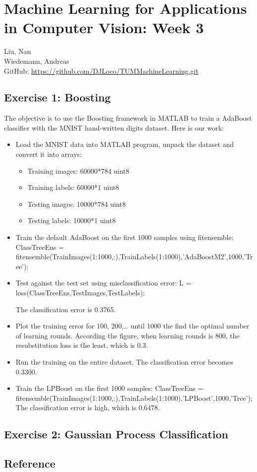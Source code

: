 \message{ !name(mlex3.tex)}\documentclass[12pt,a4paper,twoside]{article}
\begin{document}

\section*{Machine Learning for Applications \\
in Computer Vision: Week 3}
\hrulefill

Liu, Nan \\
Wiedemann, Andreas\\

GitHub: \url{https://github.com/DJLoco/TUMMachineLearning.git}\\


\hrulefill

\subsection*{Exercise 1: Boosting}
The objective is to use the Boosting framework in MATLAB to train a AdaBoost classifier with the MNIST hand-written digits dataset. Here is our work:

\begin{itemize}
\item Load the MNIST data into MATLAB program, unpack the dataset and convert it into arrays: 
  \begin{itemize}
  \item Training images: 60000*784 uint8
  \item Training labels:  60000*1 uint8
  \item Testing images: 10000*784 uint8
  \item Testing labels: 10000*1 uint8
  \end{itemize}
\item Train the default AdaBoost on the first 1000 samples using fitensemble: 
ClassTreeEns = fitensemble(TrainImages(1:1000,:),TrainLabels(1:1000),'AdaBoostM2',1000,'Tree');
\item Test against the test set using misclassification error: 
L = loss(ClassTreeEns,TestImages,TestLabels); 

The classification error is 0.3765.
\item Plot the training error for 100, 200,… until 1000 the find the optimal number of learning rounds. According the figure, when learning rounds is 800, the resubstitution loss is the least,  which is 0.3.
\item Run the training on the entire dataset. The classification error becomes 0.3300.
\item Train the LPBoost on the first 1000 samples: 
ClassTreeEns = fitensemble(TrainImages(1:1000,:),TrainLabels(1:1000),’LPBoost’,1000,’Tree’);
The classification error is high, which is 0.6478. 
\end{itemize}

\subsection*{Exercise 2: Gaussian Process Classification}

\subsection*{Reference}
\end{document}
